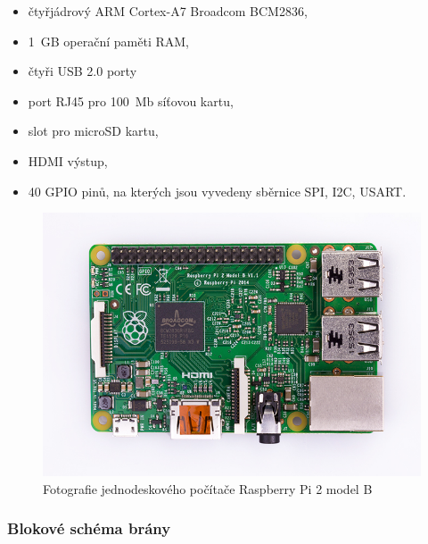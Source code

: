 \documentclass[12pt,a4paper,oneside]{article}
\begin{document}
\begin{itemize}
  \item čtyřjádrový ARM Cortex-A7 Broadcom BCM2836,
  \item 1~GB operační paměti RAM,
  \item čtyři USB 2.0 porty
  \item port RJ45 pro 100~Mb síťovou kartu,
  \item slot pro microSD kartu,
  \item HDMI výstup,
  \item 40 GPIO pinů, na kterých jsou vyvedeny sběrnice SPI, I2C, USART.
\end{itemize}

\begin{figure}[H]
\centering
\label{fig:foto/rpi2}
\includegraphics[width = 128mm]{../img/foto/rpi2.jpg}
\caption{Fotografie jednodeskového počítače Raspberry Pi 2 model B}
\end{figure}

\newpage

\subsubsection{Blokové schéma brány}
\end{document}

